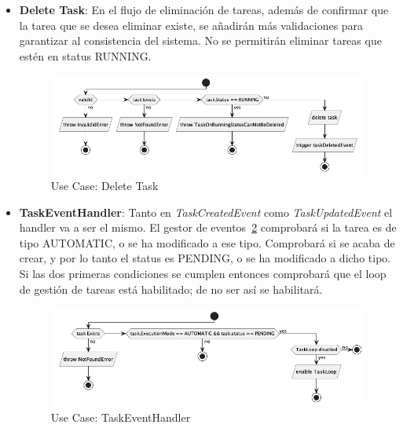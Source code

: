 \begin{itemize}
    \item \textbf{Delete Task}: En el flujo de eliminación de tareas, además de confirmar que la tarea que se desea eliminar existe, se añadirán más validaciones para garantizar al consistencia del sistema.
    No se permitirán eliminar tareas que estén en status RUNNING.

    \begin{figure}[H]
        \centering
        \includegraphics[height=0.2\textheight]{./part/Proyecto_ejecutivo/memoria_descriptiva/descripcionDelProyecto/manager/uml/deleteTaskUseCase}
        \caption{Use Case: Delete Task}\label{fig:Use Case-Delete Task}
    \end{figure}

    \item \textbf{TaskEventHandler}: Tanto en \textit{TaskCreatedEvent} como \textit{TaskUpdatedEvent} el handler va a ser el mismo.
    El gestor de eventos~\cref{fig:Use Case-TaskEventHandler} comprobará si la tarea es de tipo AUTOMATIC, o se ha modificado a ese tipo.
    Comprobará si se acaba de crear, y por lo tanto el status es PENDING, o se ha modificado a dicho tipo.
    Si las dos primeras condiciones se cumplen entonces comprobará que el loop de gestión de tareas está habilitado;
    de no ser así se habilitará.

    \begin{figure}[H]
        \centering
        \includegraphics[height=0.2\textheight]{./part/Proyecto_ejecutivo/memoria_descriptiva/descripcionDelProyecto/manager/uml/taskEventHandlerUseCase}
        \caption{Use Case: TaskEventHandler}\label{fig:Use Case-TaskEventHandler}
    \end{figure}


\end{itemize}
